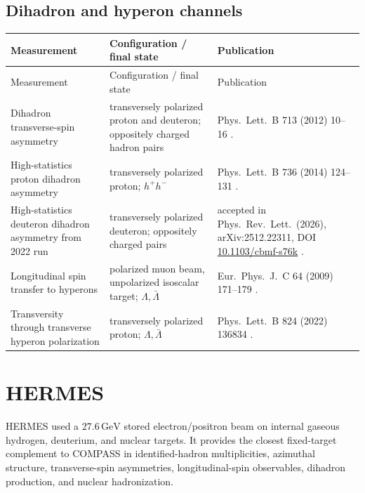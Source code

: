 \documentclass[11pt]{article}
\newcommand{\GeV}{\mathrm{GeV}}
\begin{document}
\subsection{Dihadron and hyperon channels}

\small
\begin{longtable}{@{}p{}p{}p{}@{}}
\toprule
Measurement & Configuration / final state & Publication \\ \midrule
\endfirsthead
\toprule
Measurement & Configuration / final state & Publication \\ \midrule
\endhead
Dihadron transverse-spin asymmetry &
transversely polarized proton and deuteron; oppositely charged hadron pairs &
Phys.\ Lett.\ B 713 (2012) 10--16 \cite{COMPASS:dihadron2012}. \\

High-statistics proton dihadron asymmetry &
transversely polarized proton; $h^+h^-$ &
Phys.\ Lett.\ B 736 (2014) 124--131 \cite{COMPASS:dihadronP2014}. \\

High-statistics deuteron dihadron asymmetry from 2022 run &
transversely polarized deuteron; oppositely charged pairs &
accepted in Phys.\ Rev.\ Lett.\ (2026), arXiv:2512.22311,
DOI \href{https://doi.org/10.1103/cbmf-s76k}{10.1103/cbmf-s76k}
\cite{COMPASS:dihadronD2026}. \\

Longitudinal spin transfer to hyperons &
polarized muon beam, unpolarized isoscalar target; $\Lambda,\bar\Lambda$ &
Eur.\ Phys.\ J.\ C 64 (2009) 171--179 \cite{COMPASS:Lambda2009}. \\

Transversity through transverse hyperon polarization &
transversely polarized proton; $\Lambda,\bar\Lambda$ &
Phys.\ Lett.\ B 824 (2022) 136834 \cite{COMPASS:Lambda2022}. \\
\bottomrule
\end{longtable}
\normalsize

\section{HERMES}

HERMES used a $27.6\,\GeV$ stored electron/positron beam on internal gaseous hydrogen,
deuterium, and nuclear targets.  It provides the closest fixed-target complement to COMPASS in
identified-hadron multiplicities, azimuthal structure, transverse-spin asymmetries, longitudinal-spin
observables, dihadron production, and nuclear hadronization.
\end{document}
